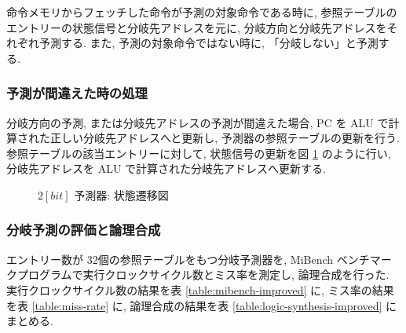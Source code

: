 \documentclass[../improvements.tex]{subflies}
\begin{document}
  命令メモリからフェッチした命令が予測の対象命令である時に, 
  参照テーブルのエントリーの状態信号と分岐先アドレスを元に, 
  分岐方向と分岐先アドレスをそれぞれ予測する.
  また, 予測の対象命令ではない時に, 「分岐しない」と予測する.

  \subsubsection{予測が間違えた時の処理}
  分岐方向の予測, または分岐先アドレスの予測が間違えた場合, 
  PC を ALU で計算された正しい分岐先アドレスへと更新し, 
  予測器の参照テーブルの更新を行う.
  参照テーブルの該当エントリーに対して, 
  状態信号の更新を図 \ref{fig:predictor-state-transition} のように行い, 
  分岐先アドレスを ALU で計算された分岐先アドレスへ更新する.

  \begin{figure}
    \centering
    \caption{$2[bit]$ 予測器: 状態遷移図}
    \label{fig:predictor-state-transition}
  \end{figure}

  \subsubsection{分岐予測の評価と論理合成}
  エントリー数が 32個の参照テーブルをもつ分岐予測器を, 
  MiBench ベンチマークプログラムで実行クロックサイクル数とミス率を測定し, 論理合成を行った.
  実行クロックサイクル数の結果を表 \ref{table:mibench-improved} に, 
  ミス率の結果を表 \ref{table:miss-rate} に, 
  論理合成の結果を表 \ref{table:logic-synthesis-improved} にまとめる.
\end{document}
